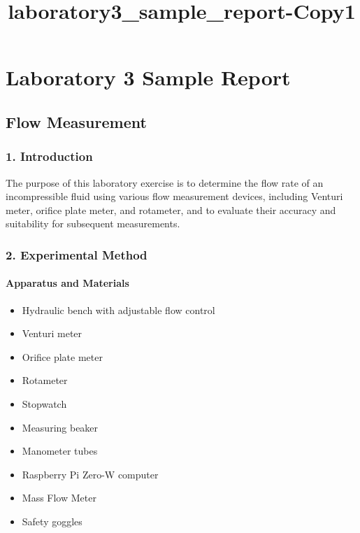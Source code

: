 \documentclass[11pt]{article}
\title{laboratory3\_sample\_report-Copy1}
\providecommand{\tightlist}{%
      \setlength{\itemsep}{0pt}\setlength{\parskip}{0pt}}
\begin{document}
    
    \maketitle
    
    

    
    \hypertarget{laboratory-3-sample-report}{%
\section{Laboratory 3 Sample Report}\label{laboratory-3-sample-report}}

\hypertarget{flow-measurement}{%
\subsection{Flow Measurement}\label{flow-measurement}}

\hypertarget{introduction}{%
\subsubsection{1. Introduction}\label{introduction}}

The purpose of this laboratory exercise is to determine the flow rate of
an incompressible fluid using various flow measurement devices,
including Venturi meter, orifice plate meter, and rotameter, and to
evaluate their accuracy and suitability for subsequent measurements.

    \hypertarget{experimental-method}{%
\subsubsection{2. Experimental Method}\label{experimental-method}}

\hypertarget{apparatus-and-materials}{%
\paragraph{Apparatus and Materials}\label{apparatus-and-materials}}

\begin{itemize}
\tightlist
\item
  Hydraulic bench with adjustable flow control
\item
  Venturi meter
\item
  Orifice plate meter
\item
  Rotameter
\item
  Stopwatch
\item
  Measuring beaker
\item
  Manometer tubes
\item
  Raspberry Pi Zero-W computer
\item
  Mass Flow Meter
\item
  Safety goggles
\end{itemize}
\end{document}
